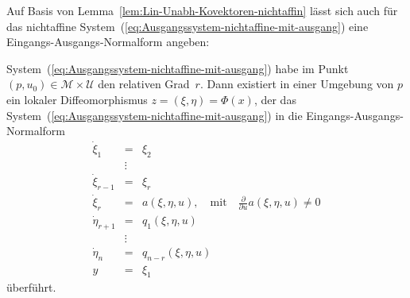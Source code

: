 Auf Basis von Lemma~\ref{lem:Lin-Unabh-Kovektoren-nichtaffin} lässt
sich auch für das nichtaffine System~(\ref{eq:Ausgangssystem-nichtaffine-mit-ausgang})
eine Eingangs-Ausgangs-Normalform angeben:
\begin{theorem}
\label{thm:EA-Form-nicht-affin}System~(\ref{eq:Ausgangssystem-nichtaffine-mit-ausgang})
habe im Punkt $(p,u_{0})\in\mathcal{M}\times\mathcal{U}$ den relativen
Grad~$r$. Dann existiert in einer Umgebung von $p$ ein lokaler
Diffeomorphismus $z=(\xi,\eta)=\Phi(x)$, der das System~(\ref{eq:Ausgangssystem-nichtaffine-mit-ausgang})
in die Eingangs-Ausgangs-Normalform 
\begin{equation}
\begin{array}{lcl}
\dot{\xi}_{1} & = & \xi_{2}\\
 & \vdots\\
\dot{\xi}_{r-1} & = & \xi_{r}\\
\dot{\xi}_{r} & = & a(\xi,\eta,u),\quad\text{mit}\quad\frac{\partial}{\partial u}a(\xi,\eta,u)\neq0\\
\dot{\eta}_{r+1} & = & q_{1}(\xi,\eta,u)\\
 & \vdots\\
\dot{\eta}_{n} & = & q_{n-r}(\xi,\eta,u)\\
y & = & \xi_{1}
\end{array}\label{eq:Eingangs-Ausgangs-NF-nichtaffin}
\end{equation}
überführt.
\end{theorem}
